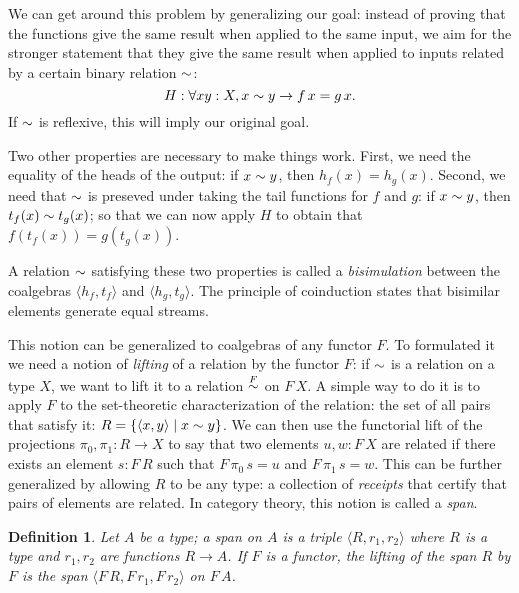 \documentclass{article}
\newtheorem{definition}{Definition}
\begin{document}
We can get around this problem by generalizing our goal: instead of proving that the functions give the same result when applied to the same input, we aim for the stronger statement that they give the same result when applied to inputs related by a certain binary relation $\sim$:
$$
H: \forall x y:X, x\sim y \rightarrow f\,x = g\,x.
$$
If $\sim$ is reflexive, this will imply our original goal.

Two other properties are necessary to make things work.
First, we need the equality of the heads of the output: if $x\sim y$, then $h_f(x) = h_g(x)$.
Second, we need that $\sim$ is preseved under taking the tail functions for $f$ and $g$: if $x\sim y$, then $t_f(x) \sim t_g(x)$; so that we can now apply $H$ to obtain that $f(t_f(x)) = g(t_g(x))$.

A relation $\sim$ satisfying these two properties is called a {\em bisimulation} between the coalgebras $\langle h_f, t_f\rangle$ and $\langle h_g, t_g\rangle$.
The principle of coinduction states that bisimilar elements generate equal streams.

This notion can be generalized to coalgebras of any functor $F$.
To formulated it we need a notion of {\em lifting} of a relation by the functor $F$: if $\sim$ is a relation on a type $X$, we want to lift it to a relation $\mathrel{\stackrel{F}{\sim}}$ on $F\,X$.
A simple way to do it is to apply $F$ to the set-theoretic characterization of the relation: the set of all pairs that satisfy it: $R = \{ \langle x, y \rangle \mid x \sim y\}$.
We can then use the functorial lift of the projections $\pi_0, \pi_1:R \rightarrow X$ to say that two elements $u,w:F\,X$ are related if there exists an element $s:F\,R$ such that $F\,\pi_0\,s = u$ and $F\,\pi_1\,s = w$.
This can be further generalized by allowing $R$ to be any type: a collection of {\em receipts} that certify that pairs of elements are related. 
In category theory, this notion is called a {\em span}.

\begin{definition}\label{def:span}
Let $A$ be a type; a {\em span} on $A$ is a triple $\langle R,r_1,r_2\rangle$ where $R$ is a type and $r_1, r_2$ are functions $R\rightarrow A$.
If $F$ is a functor, the {\em lifting of the span $R$ by $F$} is the span $\langle F\,R,F\,r_1,F\,r_2\rangle$ on $F\,A$.
\end{definition}
\end{document}
